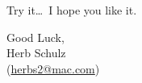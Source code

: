 \documentclass[11pt,french]{article}
\newcommand{\TS}{\textsf{\TeX Shop}}
\begin{document}
%
%
%
%


%
%
\vspace{5pt plus 2pt minus 1pt}\noindent
Try it\dots\ I hope you like it.


\vspace{5pt plus 2pt minus 1pt}
\noindent Good Luck,\\
Herb Schulz\\
(\href{mailto:herbs2@mac.com}{herbs2@mac.com})
\end{document}
